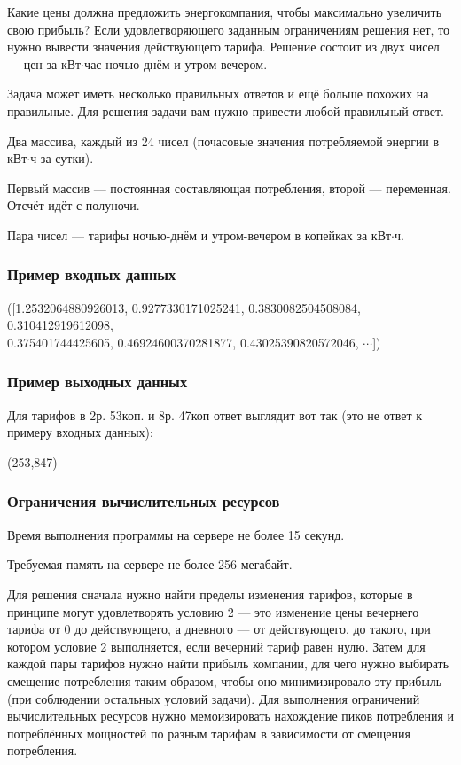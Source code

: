 Какие цены должна предложить энергокомпания, чтобы максимально увеличить свою прибыль? Если удовлетворяющего заданным ограничениям решения нет, то нужно вывести значения действующего тарифа. 
Решение состоит из двух чисел — цен за кВт$\cdot$час ночью-днём и утром-вечером.

Задача может иметь несколько правильных ответов и ещё больше похожих на правильные.
Для решения задачи вам нужно привести любой правильный ответ.


Два массива, каждый из 24 чисел (почасовые значения потребляемой энергии \linebreak в кВт$\cdot$ч за сутки). 

Первый массив — постоянная составляющая потребления, второй — переменная. Отсчёт идёт с полуночи.

\outputfmtSection

Пара чисел — тарифы ночью-днём и утром-вечером в копейках за кВт$\cdot$ч.



\subsubsection*{Пример входных данных}
\noindent([1.2532064880926013, 0.9277330171025241, 0.3830082504508084, 0.310412919612098, \\
0.375401744425605, 0.46924600370281877, 0.43025390820572046, $\cdots$])

\subsubsection*{Пример выходных данных}

Для тарифов в 2р. 53коп. и 8р. 47коп ответ выглядит вот так (это не ответ к примеру входных данных):

(253,847)

\subsubsection*{Ограничения вычислительных ресурсов}

Время выполнения программы на сервере не более 15 секунд.

Требуемая память на сервере не более 256 мегабайт.

\solutionSection

Для решения сначала нужно найти пределы изменения тарифов, которые в принципе могут удовлетворять условию 2 — это изменение цены вечернего тарифа от 0 до действующего, а дневного — от действующего, до такого, при котором условие 2 выполняется, если вечерний тариф равен нулю. Затем для каждой пары тарифов нужно найти прибыль компании, для чего нужно выбирать смещение потребления таким образом, чтобы оно минимизировало эту прибыль (при соблюдении остальных условий задачи). Для выполнения ограничений вычислительных ресурсов нужно мемоизировать нахождение пиков потребления и потреблённых мощностей по разным тарифам в зависимости от смещения потребления.

